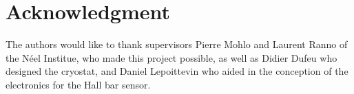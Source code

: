 \documentclass[journal]{IEEEtran}
\begin{document}



\section*{Acknowledgment}


The authors would like to thank supervisors Pierre Mohlo and Laurent Ranno of the Néel Institue, who made this project possible, as well as Didier Dufeu who designed the cryostat, and Daniel Lepoittevin who aided in the conception of the electronics for the Hall bar sensor.


\ifCLASSOPTIONcaptionsoff
  \newpage
\fi







%

\end{document}
